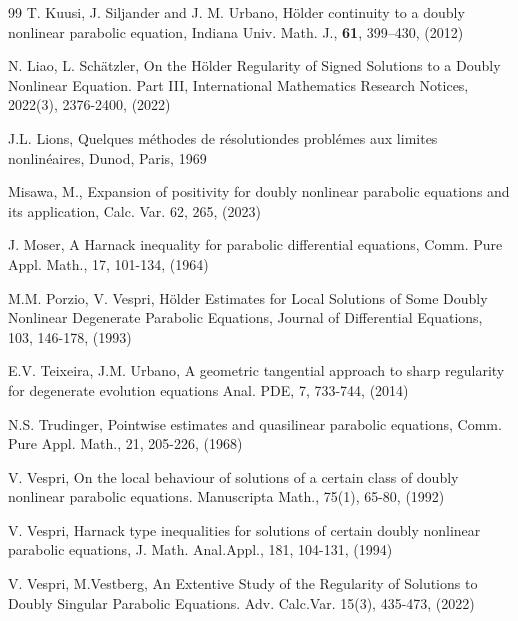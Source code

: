\documentclass[a4paper,11pt,fullpage]{article}
\numberwithin{equation}{section}
\begin{document}
\begin{thebibliography}{99}
T. Kuusi, J. Siljander and J. M.  Urbano, H\"{o}lder continuity to a doubly nonlinear parabolic equation, Indiana Univ. Math. J., {\bf 61},  399--430, (2012)
 
N. Liao, L. Sch\"atzler, On the H\"{o}lder Regularity of Signed Solutions to a Doubly Nonlinear Equation. Part III, 
International Mathematics Research Notices, 2022(3), 2376-2400, (2022)

{J.L. Lions,} Quelques m\'ethodes de r\'esolutiondes probl\'emes
aux limites nonlin\'eaires, {Dunod}, {Paris, 1969}

{Misawa, M.}, Expansion of positivity for doubly nonlinear parabolic equations and its application, Calc. Var. {62}, 265, (2023)

{J. Moser,} A Harnack inequality for parabolic differential
equations, Comm. Pure Appl. Math., {17}, 101-134, (1964)


{M.M. Porzio,  V. Vespri, } H\"{o}lder Estimates for Local Solutions of Some Doubly Nonlinear Degenerate Parabolic Equations, Journal of Differential Equations,  {103}, 146-178, (1993)




{E.V. Teixeira, J.M. Urbano}, A geometric tangential approach to sharp regularity for degenerate evolution equations
Anal. PDE, {7}, 733-744, (2014)

{N.S. Trudinger,}  Pointwise estimates and quasilinear parabolic equations, Comm. Pure Appl.
Math., {21}, 205-226, (1968)

V. Vespri, On the local behaviour of solutions of a certain class of doubly nonlinear parabolic equations.
Manuscripta Math., {75}(1), 65-80, (1992)


 V. Vespri, Harnack type inequalities for
solutions of certain doubly nonlinear parabolic equations, J. Math. Anal.Appl., {181}, 104-131, (1994)


{V. Vespri, M.Vestberg,}  An Extentive Study of the Regularity of Solutions to Doubly Singular Parabolic Equations. Adv. Calc.Var. {15}(3), 435-473, (2022)

\end{thebibliography}
\end{document}
